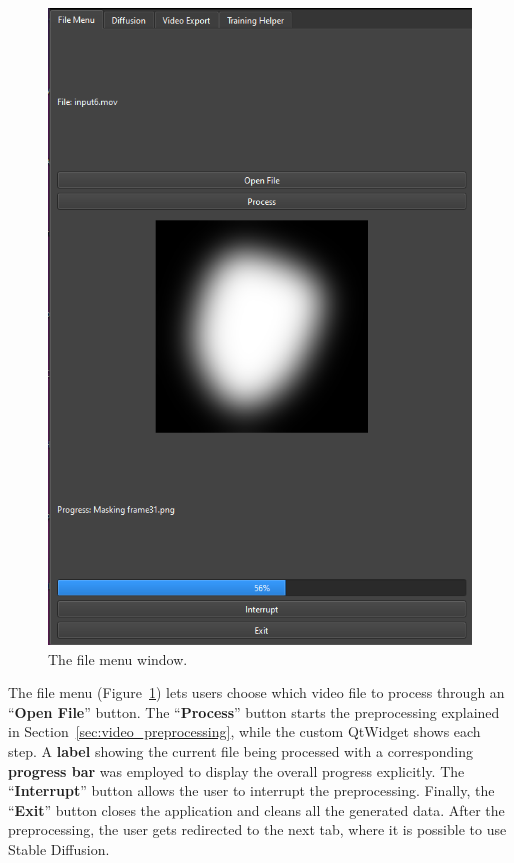 \documentclass[preprint]{elsarticle}
\begin{document}
\begin{figure}[H]
	\centering
	\includegraphics[scale=0.45, keepaspectratio]{img/project_img/file-window.png}
	\caption{The file menu window.}
	\label{fig:file-menu}
\end{figure}


The file menu (Figure~\ref{fig:file-menu}) lets users choose which video file to process through 
an ``\textbf{Open File}'' button. 
The ``\textbf{Process}'' button starts the preprocessing explained in Section~\ref{sec:video_preprocessing}, 
while the custom QtWidget shows each step. 
A \textbf{label} showing the current file being processed with a corresponding \textbf{progress bar} 
was employed to display the overall progress explicitly. The ``\textbf{Interrupt}'' button allows the user to interrupt the preprocessing.  Finally, the ``\textbf{Exit}'' button closes the application and cleans all the generated data. 
After the preprocessing, the user gets redirected to the next tab, where it is possible to use Stable Diffusion. 
\end{document}
